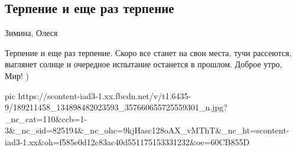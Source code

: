  
 
 
 
 
\subsection{Терпение и еще раз терпение}

Зимина, Олеся

Терпение и еще раз терпение. Скоро все станет на свои места, тучи рассеются,
выглянет солнце и очередное испытание останется в прошлом.  Доброе утро, Мир! )

\ifcmt
  pic https://scontent-iad3-1.xx.fbcdn.net/v/t1.6435-9/189211458_134898482023593_357660655725559301_n.jpg?_nc_cat=110&ccb=1-3&_nc_sid=825194&_nc_ohc=9kjHasc128oAX_vMThT&_nc_ht=scontent-iad3-1.xx&oh=f585e0d12c83ac40d551175153331232&oe=60CB855D
\fi

